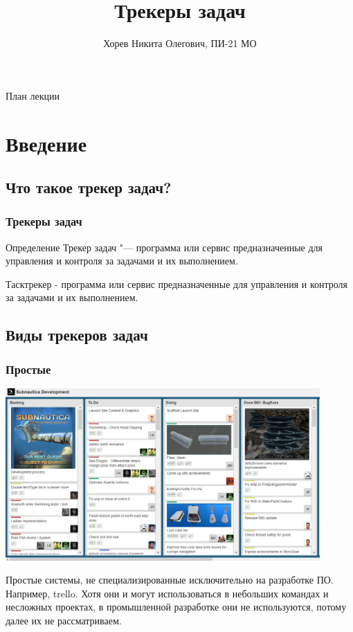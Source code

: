 \documentclass{../industrial-development}
\title{Трекеры задач}
\author{Хорев Никита Олегович, ПИ-21 МО}
\date{}
\begin{document}
\begin{frame}
  \titlepage
\end{frame}


\begin{frame}{План лекции}
  \tableofcontents
\end{frame}

\section{Введение}

\subsection{Что такое трекер задач?}

\begin{frame} \frametitle{Трекеры задач}
  \begin{block}{Определение}
    Трекер задач "--- программа или сервис предназначенные для управления и контроля за задачами и их выполнением.
  \end{block}
\end{frame}

\lecturenotes
Тасктрекер - программа или сервис предназначенные для управления и контроля за задачами и их выполнением.

\subsection{Виды трекеров задач}

\begin{frame} \frametitle{Простые}
	\centerline{\includegraphics[width=0.9\textwidth]{trello.png}}
\end{frame}

\lecturenotes
Простые системы, не специализированные исключительно на разработке ПО. Например, trello. Хотя они и могут использоваться в небольших командах и несложных проектах, в промышленной разработке они не используются, потому далее их не рассматриваем.
\end{document}

